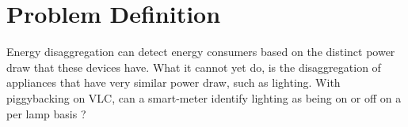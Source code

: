 

\section{Problem Definition}

Energy disaggregation can detect energy consumers based on the distinct power draw that these devices have.
What it cannot yet do, is the disaggregation of appliances that have very similar power draw, such as lighting.
With piggybacking on VLC, can a smart-meter identify lighting as being on or off on a per lamp basis ?
